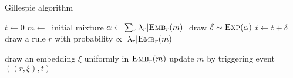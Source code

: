 \begin{algorithm}
\caption{Gillespie algorithm}\label{alg:gillespie}
\begin{spacing}{1.2}
\begin{algorithmic}
\vspace{0.2cm}
  \STATE $t \gets 0$
  \STATE $m \gets\ $ initial mixture
      \STATE $\alpha \gets \sum_r {\lambda_r |{\textsc{Emb}}_{r}(m)|}$
      \STATE draw $\delta \sim \textsc{Exp}(\alpha) $
      \STATE $t \gets t + \delta$
      \STATE draw a rule $r$ with probability
      $\propto \ \lambda_r |{\textsc{Emb}}_{r}(m)|$

      \STATE draw an embedding $\xi$ uniformly in ${\textsc{Emb}}_{r}(m)$
      \STATE update $m$ by triggering event $((r, \xi), t)$
  \ENDWHILE
\vspace{0.1cm}
\end{algorithmic}
\end{spacing}
\end{algorithm}